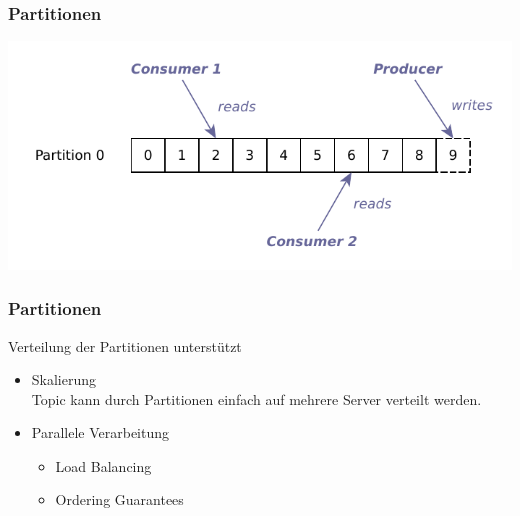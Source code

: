 \begin{frame}
\frametitle{Partitionen}
	\centering
	\includegraphics[scale=0.75]{figure/partition.pdf}
	
\end{frame}

\begin{frame}
\frametitle{Partitionen}
	Verteilung der Partitionen unterstützt
	\begin{itemize}
		\item Skalierung\\
			Topic kann durch Partitionen einfach auf mehrere Server verteilt werden.
		\item Parallele Verarbeitung
		\begin{itemize}
			\item Load Balancing
			\item Ordering Guarantees
		\end{itemize}
	\end{itemize}
\end{frame}



